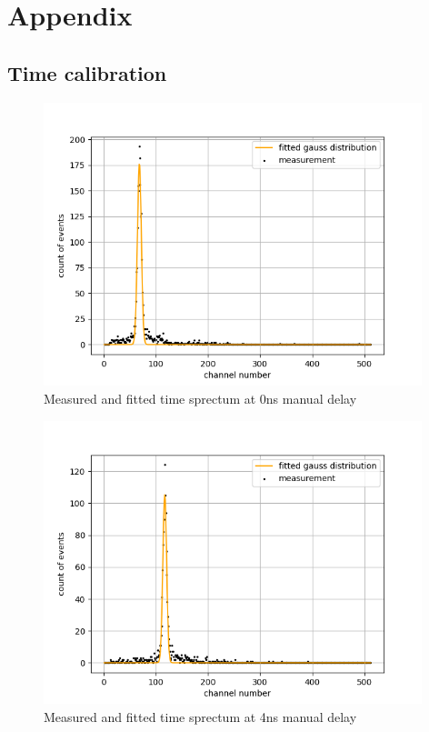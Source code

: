 \chapter{Appendix}
\section{Time calibration}
\label{chap:appendix time calibration}
\begin{figure}[H]
    \centering
    \includegraphics[width=110mm,scale=0.5]{Positronium/include/timecalibration0.png}
    \caption{Measured and fitted time sprectum at 0ns manual delay} 
    \label{fig:0nsnofit}
\end{figure}

\begin{figure}[H]
    \centering
    \includegraphics[width=110mm,scale=0.5]{Positronium/include/timecalibration1.png}
    \caption{Measured and fitted time sprectum at 4ns manual delay} 
    \label{fig:0nsnofit}
\end{figure}


